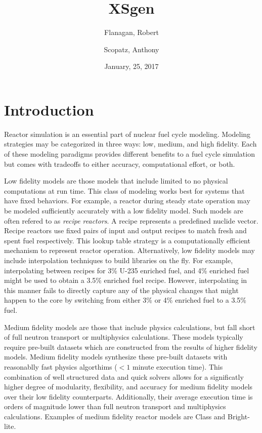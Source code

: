 \documentclass{article}
\begin{document}
\title{XSgen}
\date{January, 25, 2017}
\author{Flanagan, Robert \and Scopatz, Anthony}
\maketitle
\onehalfspacing

\section{Introduction}
Reactor simulation is an essential part of nuclear fuel cycle modeling. Modeling strategies
may be categorized in three ways: low, medium, and high fidelity. Each of these modeling
paradigms provides different benefits to a fuel cycle simulation but comes with tradeoffs to
either accuracy, computational effort, or both.

Low fidelity models are those models that include limited to no physical computations at run time.
This class of modeling works best for systems that have fixed behaviors. For example, a reactor
during steady state operation may be modeled sufficiently accurately with a low fidelity model.
Such models are often refered to as \emph{recipe reactors}. A recipe represents a predefined
nuclide vector. Recipe reactors use fixed pairs of input and output recipes to
match fresh and spent
fuel respectively. This lookup table strategy is a computationally efficient mechanism to
represent reactor operation. Alternatively, low fidelity models may include interpolation
techniques to build libraries on the fly. For example, interpolating between recipes for
3\% U-235 enriched fuel, and 4\% enriched fuel might be used to obtain a 3.5\% enriched
fuel recipe.
However, interpolating in this manner fails to directly capture any of the physical changes
that might happen to the core by switching from either 3\% or 4\% enriched fuel to a 3.5\% fuel.

Medium fidelity models are those that include physics calculations, but fall short of
full neutron transport or multiphysics calculations. These models typically require
pre-built datasets which are constructed from the results of higher fidelity models.
Medium fidelity models synthesize these pre-built datasets with reasonablly fast physics
algorthims ($<1$ minute execution time). This combination of well structured data and
quick solvers allows for a significatly higher degree of modularity, flexibility, and accuracy
for medium fidelity models over their low fidelity counterparts. Additionally, their average
execution time is orders of magnitude lower than full neutron transport and multiphysics
calculations. Examples of medium fidelity reactor models are Class\cite{class}
and Bright-lite\cite{brightlite,flanagan}.
\end{document}
